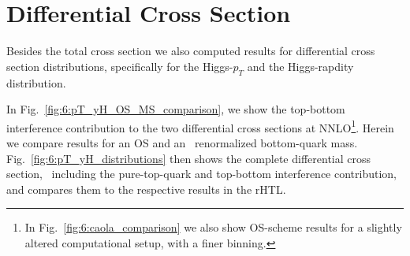 \section{Differential Cross Section}
Besides the total cross section we also computed results for differential cross section distributions, specifically for the Higgs-$p_T$ and the Higgs-rapdity distribution.

In Fig.~\ref{fig:6:pT_yH_OS_MS_comparison}, we show the top-bottom interference contribution to the two differential cross sections at \acs{NNLO}\footnote{In Fig.~\ref{fig:6:caola_comparison} we also show \acs{OS}-scheme results for a slightly altered computational setup, with a finer binning.}. Herein we compare results for an \acs{OS} and an \MS\ renormalized bottom-quark mass. Fig.~\ref{fig:6:pT_yH_distributions} then shows the complete differential cross section, \ie\ including the pure-top-quark and top-bottom interference contribution, and compares them to the respective results in the \acs{rHTL}.
